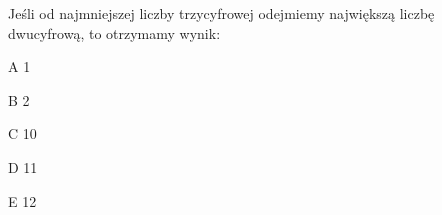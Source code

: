 \begin{tresc}
Jeśli od najmniejszej liczby trzycyfrowej odejmiemy największą liczbę dwucyfrową, to otrzymamy wynik:
\end{tresc}
\begin{wariant}{A} 1 \end{wariant}
\begin{wariant}{B} 2 \end{wariant}
\begin{wariant}{C} 10 \end{wariant}
\begin{wariant}{D} 11 \end{wariant}
\begin{wariant}{E} 12 \end{wariant}
